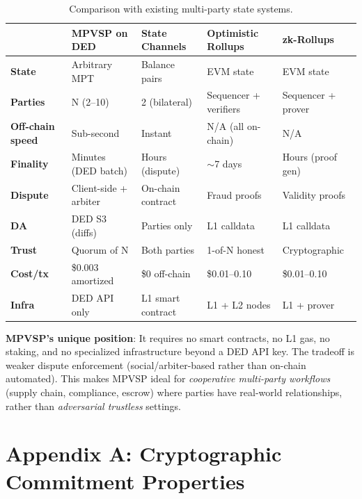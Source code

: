 \documentclass[11pt,a4paper]{article}
\begin{document}
\begin{table}[H]
\centering
\small
\begin{tabularx}{\textwidth}{lXXXX}
\toprule
& \textbf{MPVSP on DED} & \textbf{State Channels} & \textbf{Optimistic Rollups}
  & \textbf{zk-Rollups} \\
\midrule
\textbf{State} & Arbitrary MPT & Balance pairs & EVM state & EVM state \\
\textbf{Parties} & N (2--10) & 2 (bilateral) & Sequencer + verifiers
  & Sequencer + prover \\
\textbf{Off-chain speed} & Sub-second & Instant & N/A (all on-chain)
  & N/A \\
\textbf{Finality} & Minutes (DED batch) & Hours (dispute) & $\sim$7 days
  & Hours (proof gen) \\
\textbf{Dispute} & Client-side + arbiter & On-chain contract & Fraud proofs
  & Validity proofs \\
\textbf{DA} & DED S3 (diffs) & Parties only & L1 calldata & L1 calldata \\
\textbf{Trust} & Quorum of N & Both parties & 1-of-N honest & Cryptographic \\
\textbf{Cost/tx} & \$0.003 amortized & \$0 off-chain & \$0.01--0.10
  & \$0.01--0.10 \\
\textbf{Infra} & DED API only & L1 smart contract & L1 + L2 nodes
  & L1 + prover \\
\bottomrule
\end{tabularx}
\caption{Comparison with existing multi-party state systems.}
\label{tab:comparison}
\end{table}

\noindent \textbf{MPVSP's unique position}: It requires no smart contracts,
no L1 gas, no staking, and no specialized infrastructure beyond a DED API
key. The tradeoff is weaker dispute enforcement (social/arbiter-based rather
than on-chain automated). This makes MPVSP ideal for \emph{cooperative
multi-party workflows} (supply chain, compliance, escrow) where parties have
real-world relationships, rather than \emph{adversarial trustless} settings.


\section*{Appendix A: Cryptographic Commitment Properties}
\end{document}
